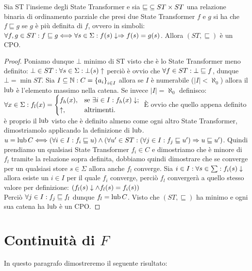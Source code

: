 \begin{proposizione} 
Sia ST l'insieme degli State Transformer e sia $\mathord{\sqsubseteq}\subseteq ST\times ST$ una relazione binaria di ordinamento parziale che presi due State Transformer $f$ e $g$ si ha che $f \sqsubseteq g$ se $g$ è più definita di $f$, ovvero in simboli: $\forall f,g \in ST \mathrel{:} f \sqsubseteq g \Longleftrightarrow \forall s \in \Sigma \mathrel{:} f(s)\downarrow \Rightarrow f(s) = g(s)$. Allora $(ST, \sqsubseteq)$ è un CPO.
\end{proposizione}
\begin{proof}
Poniamo dunque $\bot$ minimo di ST visto che è lo State Transformer meno definito: $\bot \in ST \mathrel{:} \forall s \in \Sigma \mathrel{:} \bot(s)\uparrow$ perciò è ovvio che $\forall f \in ST \mathrel{:} \bot \sqsubseteq f$, dunque $\bot = \min ST$.
Sia $I \subseteq \mathbb{N} \mathrel{:} C = \left\{a_i\right\}_{i \in I}$ allora se $I$ è numerabile ($|I| < \aleph_0$) allora il $\mathop{\mathrm{lub}}\nolimits$ è l'elemento massimo nella catena. Se invece $|I| = \aleph_0$ definisco:
        $\forall x \in \Sigma \mathrel{:} f_l(x) =
    \begin{cases}
      f_h(x), &\text{se $\exists i \in I \mathrel{:} f_h(x)\downarrow$;}\\
      \uparrow, &\text{altrimenti.}
    \end{cases}\\ $
È ovvio che quello appena definito è proprio il $\mathop{\mathrm{lub}}\nolimits$ visto che è definito almeno come ogni altro State Transformer, dimostriamolo applicando la definizione di $\mathop{\mathrm{lub}}\nolimits$.
$u = \mathop{\mathrm{lub}}\nolimits C \Longleftrightarrow (\forall i \in I \mathrel{:} f_i \sqsubseteq u) \land (\forall u' \in ST \mathrel{:} (\forall j \in I \mathrel{:} f_j \sqsubseteq u') \Rightarrow u \sqsubseteq u')$.
Quindi prendiamo un qualsiasi State Transformer $f_i \in C$ e dimostriamo che è minore di $f_l$ tramite la relazione sopra definita, dobbiamo quindi dimostrare che se converge per un qualsiasi store $s \in \Sigma$ allora anche $f_l$ converge. Sia $i \in I \mathrel{:} \forall s \in \sum \mathrel{:} f_i(s)\downarrow$ allora esiste un $i \in I$ per il quale $f_i$ converge, perciò $f_l$ convergerà a quello stesso valore per definizione: $(f_l(s)\downarrow \land f_l(s)=f_i(s))$\\
Perciò $\forall j \in I \mathrel{:} f_j \sqsubseteq f_l$ dunque  $f_l = \mathop{\mathrm{lub}}\nolimits C$. Visto che $(ST, \sqsubseteq)$ ha minimo e ogni sua catena ha $\mathop{\mathrm{lub}}\nolimits$ è un CPO.
\end{proof}

\section{Continuità di $F$}
In questo paragrafo dimostreremo il seguente risultato:


